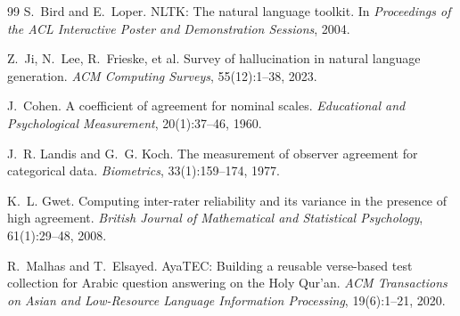 \documentclass[pdflatex,sn-mathphys-num]{sn-jnl}
\begin{document}
\begin{thebibliography}{99}
S.~Bird and E.~Loper.
\newblock NLTK: The natural language toolkit.
\newblock In \emph{Proceedings of the ACL Interactive Poster and
Demonstration Sessions}, 2004.

Z.~Ji, N.~Lee, R.~Frieske, et al.
\newblock Survey of hallucination in natural language generation.
\newblock \emph{ACM Computing Surveys}, 55(12):1--38, 2023.

J.~Cohen.
\newblock A coefficient of agreement for nominal scales.
\newblock \emph{Educational and Psychological Measurement}, 20(1):37--46, 1960.

J.~R. Landis and G.~G. Koch.
\newblock The measurement of observer agreement for categorical data.
\newblock \emph{Biometrics}, 33(1):159--174, 1977.

K.~L. Gwet.
\newblock Computing inter-rater reliability and its variance in the presence
of high agreement.
\newblock \emph{British Journal of Mathematical and Statistical Psychology},
61(1):29--48, 2008.

R.~Malhas and T.~Elsayed.
\newblock AyaTEC: Building a reusable verse-based test collection for Arabic
question answering on the Holy Qur'an.
\newblock \emph{ACM Transactions on Asian and Low-Resource Language
Information Processing}, 19(6):1--21, 2020.

\end{thebibliography}
\end{document}
